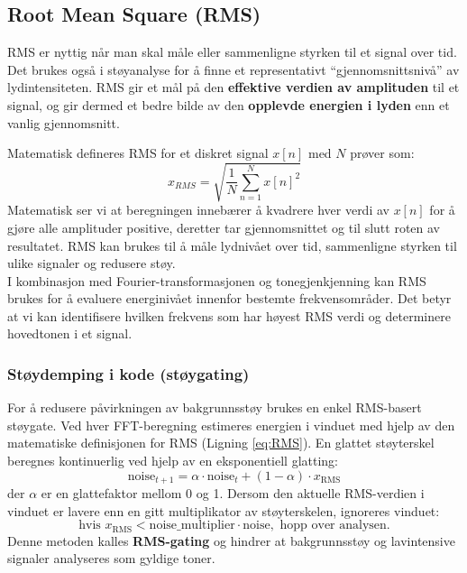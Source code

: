 \subsection{Root Mean Square (RMS)}
RMS er nyttig når man skal måle eller sammenligne styrken til et signal over tid. Det brukes også i støyanalyse for å finne et representativt “gjennomsnittsnivå” av lydintensiteten. RMS gir et mål på den \textbf{effektive verdien av amplituden} til et signal, og gir dermed et bedre bilde av den \textbf{opplevde energien i lyden} enn et vanlig gjennomsnitt.

Matematisk defineres RMS for et diskret signal $x[n]$ med $N$ prøver som:
\begin{equation}
    x_{RMS} = \sqrt{\frac{1}{N} \sum_{n=1}^{N} x[n]^2}
    \label{eq:RMS}
\end{equation}
\noindent
Matematisk ser vi at beregningen innebærer å kvadrere hver verdi av $x[n]$ for å gjøre alle amplituder positive, deretter tar gjennomsnittet og til slutt roten av resultatet. RMS kan brukes til å måle lydnivået over tid, sammenligne styrken til ulike signaler og redusere støy. \\
I kombinasjon med Fourier-transformasjonen og tonegjenkjenning kan RMS brukes for å evaluere energinivået innenfor bestemte frekvensområder. Det betyr at vi kan identifisere hvilken frekvens som har høyest RMS verdi og determinere hovedtonen i et signal.

\subsubsection{Støydemping i kode (støygating)}
For å redusere påvirkningen av bakgrunnsstøy brukes en enkel RMS-basert støygate. Ved hver FFT-beregning estimeres energien i vinduet med hjelp av den matematiske definisjonen for RMS (Ligning \ref{eq:RMS}). En glattet støyterskel beregnes kontinuerlig ved hjelp av en eksponentiell glatting:
\[
\text{noise}_{t+1} = \alpha \cdot \text{noise}_t + (1 - \alpha) \cdot x_{\text{RMS}}
\]
der $\alpha$ er en glattefaktor mellom 0 og 1. 
Dersom den aktuelle RMS-verdien i vinduet er lavere enn en gitt multiplikator av støyterskelen, ignoreres vinduet:
\[
\text{hvis } x_{\text{RMS}} < \text{noise\_multiplier} \cdot \text{noise}, \text{ hopp over analysen.}
\]
Denne metoden kalles \textbf{RMS-gating} og hindrer at bakgrunnsstøy og lavintensive signaler analyseres som gyldige toner.
